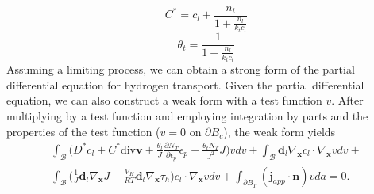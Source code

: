\documentclass[10pt]{elsarticle}
\newcommand{\mbs}[1]{\boldsymbol{#1}}
\def\bs{{\mbs{s}}} \def\bt{{\mbs{t}}} \def\bu{{\mbs{u}}}
\def\bs{\boldsymbol}
\begin{document}
%
\begin{equation}
\label{eq.Cstar}{C^{*} = c_{l} +\frac{n_{t}}{1 + \frac{n_{l}}{k_{t} c_{l}}} }
\end{equation}
%
\begin{equation}
\label{eq.thetat2}{\theta_{t} = \frac{1}{1 + \frac{n_{l}}{k_{t} c_{l}}} }
\end{equation}
%
Assuming a limiting process, we can obtain a strong form of the partial differential equation for hydrogen transport.
%
%
Given the partial differential equation, we can also construct a weak form with a test function $v$.  After multiplying by a test function and employing integration by parts and the properties of the test function ($v = 0$ on $\partial B_{c}$), the weak form yields
%
\begin{eqnarray}
\label{eq.weakform}  \int_{\mathcal{B}}  \bigg( D^{*}\dot{c}_{l} + C^{*}\text{div}\bs{v} + \frac{\theta_{l}}{J} \frac{\partial N_{T}}{\partial \epsilon_{p}} \dot{\epsilon}_{p} -  \frac{\theta_{t} N_{T}}{J^{2}}  \dot{J} \bigg)vdv + \int_{\mathcal{B}} \bs{d}_{l} \nabla_{\bs{x}}c_{l} \cdot  \nabla_{\bs{x}}vdv + \nonumber \\  \int_{\mathcal{B}} \bigg( \frac{1}{J} \bs{d}_{l} \nabla_{\bs{x}}J - \frac{V_{H}}{R T} \bs{d}_{l} \nabla_{\bs{x}}\tau_{h} \bigg)c_{l}   \cdot  \nabla_{\bs{x}}vdv + \int_{\partial B_{\Gamma}} (\bs{j}_{app} \cdot \bs{n}) v da = 0.
\end{eqnarray}
\end{document}
